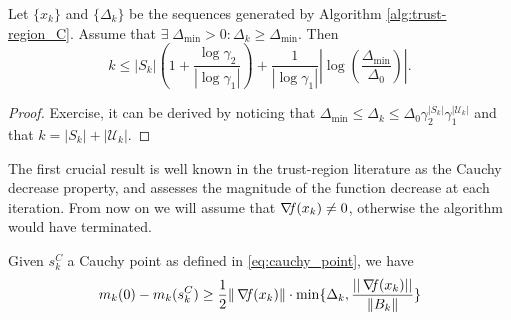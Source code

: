 \documentclass[10pt,a4paper]{article}
\begin{document}
\begin{lemma}
	Let $\{x_k\}$ and $\{\Delta_k\}$ be the sequences generated by Algorithm \ref{alg:trust-region_C}. Assume that $\exists \; \Delta_{\min} > 0: \Delta_k \geq \Delta_{\min}$. Then
	\begin{equation*}
		k \leq |S_k| \left( 1 + \frac{\log \gamma_2}{|\log \gamma_1|} \right) + \frac{1}{|\log \gamma_1|} \left| \log \left( \frac{\Delta_{\min}}{\Delta_0} \right) \right|.
	\end{equation*}
\end{lemma}

\begin{proof}
	Exercise, it can be derived by noticing that $\Delta_{\min} \leq \Delta_k \leq \Delta_0 \gamma_2^{|S_k|} \gamma_1^{|\mathcal{U}_k|}$ and that $k= |S_k| + |\mathcal{U}_k|$.
\end{proof}
\noindent The first crucial result is well known in the trust-region literature as the Cauchy
decrease property, and assesses the magnitude of the function decrease at each iteration. From now on we will assume that $\operatorname*{\mathit{\nabla \!f}}(x_k)\neq 0$, otherwise the algorithm would have terminated.  
\begin{lemma}\label{lemma:model_decrease}
	Given $s_k^C$ a Cauchy point as defined in \eqref{eq:cauchy_point}, we have
	\begin{equation}\label{eq:model_decrease}
		m_k(0)-m_k(s_k^C) \geq \frac{1}{2}\|\operatorname*{\mathit{\nabla \!f}}(x_k)\|\cdot \min\{\Delta_k, \frac{||\operatorname*{\mathit{\nabla \!f}}(x_k)||}{\|B_k\|} \}
	\end{equation}
\end{lemma}
\end{document}
